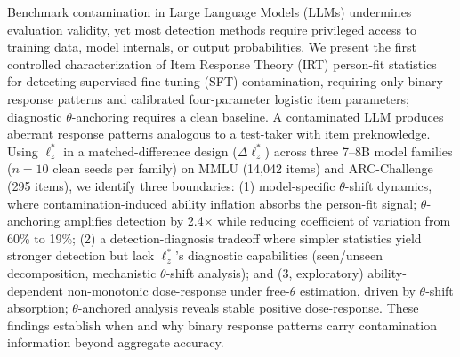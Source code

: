 Benchmark contamination in Large Language Models (LLMs) undermines evaluation validity, yet most detection methods require privileged access to training data, model internals, or output probabilities.
We present the first controlled characterization of Item Response Theory (IRT) person-fit statistics for detecting supervised fine-tuning (SFT) contamination, requiring only binary response patterns and calibrated four-parameter logistic item parameters; diagnostic $\theta$-anchoring requires a clean baseline.
A contaminated LLM produces aberrant response patterns analogous to a test-taker with item preknowledge.
Using $\ell_z^*$ in a matched-difference design ($\Delta\ell_z^*$) across three 7--8B model families ($n{=}10$ clean seeds per family) on MMLU (14,042 items) and ARC-Challenge (295 items), we identify three boundaries:
(1) model-specific $\theta$-shift dynamics, where contamination-induced ability inflation absorbs the person-fit signal; $\theta$-anchoring amplifies detection by 2.4$\times$ while reducing coefficient of variation from 60\% to 19\%;
(2) a detection-diagnosis tradeoff where simpler statistics yield stronger detection but lack $\ell_z^*$'s diagnostic capabilities (seen/unseen decomposition, mechanistic $\theta$-shift analysis);
and (3, exploratory) ability-dependent non-monotonic dose-response under free-$\theta$ estimation, driven by $\theta$-shift absorption; $\theta$-anchored analysis reveals stable positive dose-response.
These findings establish when and why binary response patterns carry contamination information beyond aggregate accuracy.
